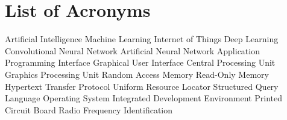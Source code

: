 \documentclass[a4paper, 11pt, oneside]{Thesis-1}
\begin{document}
\tableofcontents

\listoffigures

\listoftables

{}
\chapter*{List of Acronyms}

\begin{acronym}[HTTPS]
     {Artificial Intelligence}
     {Machine Learning}
    {Internet of Things}
     {Deep Learning}
    {Convolutional Neural Network}
    {Artificial Neural Network}
    {Application Programming Interface}
    {Graphical User Interface}
    {Central Processing Unit}
    {Graphics Processing Unit}
    {Random Access Memory}
    {Read-Only Memory}
   {Hypertext Transfer Protocol}
    {Uniform Resource Locator}
    {Structured Query Language}
     {Operating System}
    {Integrated Development Environment}
    {Printed Circuit Board}
   {Radio Frequency Identification}
\end{acronym}

\clearpage

\pagestyle{empty}

\mainmatter
\pagestyle{fancy}




\end{document}
